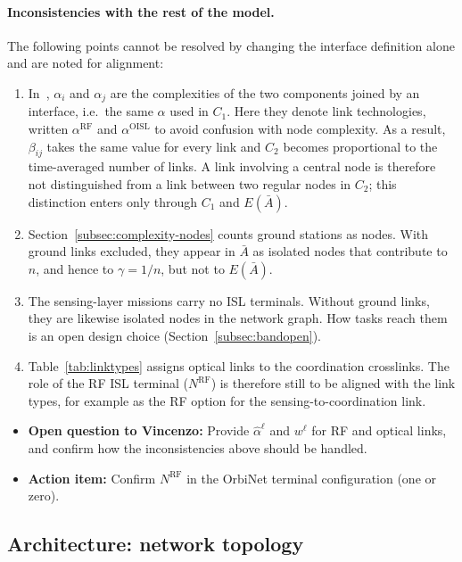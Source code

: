 \documentclass[11pt]{article}
\newcommand{\vincenzoq}[1]{\textcolor{vincenzoq}{\textbf{Open question to Vincenzo:}} #1}
\newcommand{\actionitem}[1]{\textcolor{todo}{\textbf{Action item:}} #1}
\begin{document}
\paragraph{Inconsistencies with the rest of the model.} The following points cannot be resolved by changing the interface definition alone and are noted for alignment:
\begin{enumerate}[leftmargin=1.2cm]
    \item In~\cite{sinha2013}, $\alpha_i$ and $\alpha_j$ are the complexities of the two components joined by an interface, i.e.\ the same $\alpha$ used in $C_1$. Here they denote link technologies, written $\alpha^{\mathrm{RF}}$ and $\alpha^{\mathrm{OISL}}$ to avoid confusion with node complexity. As a result, $\beta_{ij}$ takes the same value for every link and $C_2$ becomes proportional to the time-averaged number of links. A link involving a central node is therefore not distinguished from a link between two regular nodes in $C_2$; this distinction enters only through $C_1$ and $E(\bar{A})$.
    \item Section~\ref{subsec:complexity-nodes} counts ground stations as nodes. With ground links excluded, they appear in $\bar{A}$ as isolated nodes that contribute to $n$, and hence to $\gamma = 1/n$, but not to $E(\bar{A})$.
    \item The sensing-layer missions carry no ISL terminals. Without ground links, they are likewise isolated nodes in the network graph. How tasks reach them is an open design choice (Section~\ref{subsec:bandopen}).
    \item Table~\ref{tab:linktypes} assigns optical links to the coordination crosslinks. The role of the RF ISL terminal ($N^{\mathrm{RF}}$) is therefore still to be aligned with the link types, for example as the RF option for the sensing-to-coordination link.
\end{enumerate}

\begin{itemize}[leftmargin=1.2cm]
    \item \vincenzoq{Provide $\hat{\alpha}^{\ell}$ and $w^{\ell}$ for RF and optical links, and confirm how the inconsistencies above should be handled.}
    \item \actionitem{Confirm $N^{\mathrm{RF}}$ in the OrbiNet terminal configuration (one or zero).}
\end{itemize}

\subsection{Architecture: network topology}\label{subsec:complexity-topology}
\end{document}
